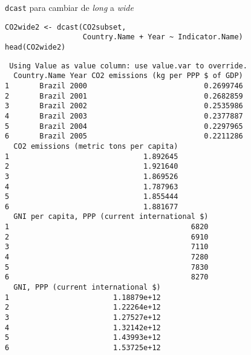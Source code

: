 \documentclass[xcolor={usenames,svgnames,dvipsnames}]{beamer}
\begin{document}
\begin{frame}[fragile,label=sec-3-3-3]{\texttt{dcast} para cambiar de \emph{long} a \emph{wide}}
 \lstset{language=R,label= ,caption= ,numbers=none}
\begin{lstlisting}
CO2wide2 <- dcast(CO2subset,
                  Country.Name + Year ~ Indicator.Name)
head(CO2wide2)
\end{lstlisting}

\begin{verbatim}
 Using Value as value column: use value.var to override.
  Country.Name Year CO2 emissions (kg per PPP $ of GDP)
1       Brazil 2000                           0.2699746
2       Brazil 2001                           0.2682859
3       Brazil 2002                           0.2535986
4       Brazil 2003                           0.2377887
5       Brazil 2004                           0.2297965
6       Brazil 2005                           0.2211286
  CO2 emissions (metric tons per capita)
1                               1.892645
2                               1.921640
3                               1.869526
4                               1.787963
5                               1.855444
6                               1.881677
  GNI per capita, PPP (current international $)
1                                          6820
2                                          6910
3                                          7110
4                                          7280
5                                          7830
6                                          8270
  GNI, PPP (current international $)
1                        1.18879e+12
2                        1.22264e+12
3                        1.27527e+12
4                        1.32142e+12
5                        1.43993e+12
6                        1.53725e+12
\end{verbatim}
\end{frame}
\end{document}
